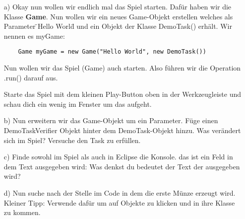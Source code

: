 

\begin{enumerate}
    \item[a)] Okay nun wollen wir endlich mal das Spiel starten. Dafür haben wir die Klasse \textbf{Game}. Nun wollen wir ein neues Game-Objekt erstellen welches als Parameter \"{}Hello World\"{} und ein Objekt der Klasse DemoTask() erhält. Wir nennen es myGame:
    
    \begin{lstlisting}
    Game myGame = new Game("Hello World", new DemoTask())
    \end{lstlisting}
    
    Nun wollen wir das Spiel (Game) auch starten. Also führen wir die Operation .run() darauf aus. 
    
    Starte das Spiel mit dem kleinen Play-Button oben in der Werkzeugleiste und schau dich ein wenig im Fenster um das aufgeht.
    
    \item[b)] Nun erweitern wir das Game-Objekt um ein Parameter. Füge einen DemoTaskVerifier Objekt hinter dem DemoTask-Objekt hinzu. Was verändert sich im Spiel? Versuche den Task zu erfüllen.
    
    \item[c)] Finde sowohl im Spiel als auch in Eclipse die Konsole. das ist ein Feld in dem Text ausgegeben wird:
    Was denkst du bedeutet der Text der ausgegeben wird?
    
    \item[d)] Nun suche nach der Stelle im Code in dem die erste Münze erzeugt wird. Kleiner Tipp: Verwende dafür  um auf Objekte zu klicken und in ihre Klasse zu kommen.
\end{enumerate}
